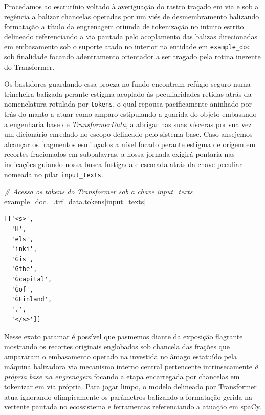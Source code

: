 \documentclass[
  brazilian,
]{article}
\newenvironment{Shaded}{}{}
\newcommand{\CommentTok}[1]{\textcolor[rgb]{0.38,0.63,0.69}{\textit{#1}}}
\newcommand{\NormalTok}[1]{#1}
\newcommand{\StringTok}[1]{\textcolor[rgb]{0.25,0.44,0.63}{#1}}
\begin{document}
Procedamos ao escrutínio voltado à averiguação do rastro traçado em via
e sob a regência a balizar chancelas operadas por um viés de
desmembramento balizando formatação a título da engrenagem oriunda de
tokenização no intuito estrito delineado referenciando a via pautada
pelo acoplamento das balizas direcionadas em embasamento sob o suporte
atado no interior na entidade em \texttt{example\_doc} sob finalidade
focando adentramento orientador a ser tragado pela rotina inerente do
Transformer.

Os bastidores guardando essa proeza no fundo encontram refúgio seguro
numa trincheira balizada perante estigma acoplado às peculiaridades
retidas atrás da nomenclatura rotulada por \texttt{tokens}, o qual
repousa pacificamente aninhado por trás do manto a atuar como amparo
estipulando a guarida do objeto embasando a engenharia base de
\emph{TransformerData}, a abrigar nas suas vísceras por sua vez um
dicionário enredado no escopo delineado pelo sistema base. Caso
ansejemos alcançar os fragmentos esmiuçados a nível focado perante
estigma de origem em recortes fracionados em subpalavras, a nossa
jornada exigirá pontaria nas indicações guiando nossa busca fustigada e
escorada atrás da chave peculiar nomeada no pilar \texttt{input\_texts}.

\begin{Shaded}
\begin{Highlighting}[]
\CommentTok{\# Acessa os tokens do Transformer sob a chave \textquotesingle{}input\_texts\textquotesingle{}}
\NormalTok{example\_doc.\_.trf\_data.tokens[}\StringTok{\textquotesingle{}input\_texts\textquotesingle{}}\NormalTok{]}
\end{Highlighting}
\end{Shaded}

\begin{verbatim}
[['<s>',
  'H',
  'els',
  'inki',
  'Ġis',
  'Ġthe',
  'Ġcapital',
  'Ġof',
  'ĠFinland',
  '.',
  '</s>']]
\end{verbatim}

Nesse exato patamar é possível que pasmemos diante da exposição
flagrante mostrando os recortes originais englobados sob chancela das
frações que ampararam o embasamento operado na investida no âmago
estatuído pela máquina balizadora via mecanismo interno central
pertencente intrinsecamente \emph{à própria base na engrenagem} focando
a etapa encarregada por chancelas em tokenizar em via própria. Para
jogar limpo, o modelo delineado por Transformer atua ignorando
olimpicamente os parâmetros balizando a formatação gerida na vertente
pautada no ecossistema e ferramentas referenciando a atuação em spaCy.
\end{document}
